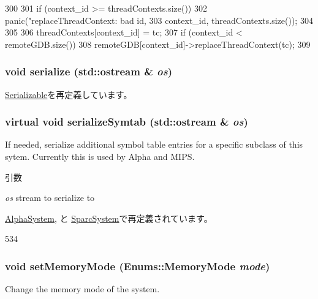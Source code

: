 \begin{DoxyCode}
300 {
301     if (context_id >= threadContexts.size()) {
302         panic("replaceThreadContext: bad id, %
303               context_id, threadContexts.size());
304     }
305 
306     threadContexts[context_id] = tc;
307     if (context_id < remoteGDB.size())
308         remoteGDB[context_id]->replaceThreadContext(tc);
309 }
\end{DoxyCode}
\hypertarget{classSystem_a53e036786d17361be4c7320d39c99b84}{
\subsubsection[{serialize}]{\setlength{\rightskip}{0pt plus 5cm}void serialize (std::ostream \& {\em os})}}
\label{classSystem_a53e036786d17361be4c7320d39c99b84}


\hyperlink{classSerializable_ad6272f80ae37e8331e3969b3f072a801}{Serializable}を再定義しています。\hypertarget{classSystem_a4a6e514fbf1ef35f9a914680884cedef}{
\subsubsection[{serializeSymtab}]{\setlength{\rightskip}{0pt plus 5cm}virtual void serializeSymtab (std::ostream \& {\em os})}}
\label{classSystem_a4a6e514fbf1ef35f9a914680884cedef}
If needed, serialize additional symbol table entries for a specific subclass of this sytem. Currently this is used by Alpha and MIPS.


\begin{DoxyParams}{引数}
\item[{\em os}]stream to serialize to \end{DoxyParams}


\hyperlink{classAlphaSystem_a4a3f2000b7188750d8fc90aa204fbfd9}{AlphaSystem}, と \hyperlink{classSparcSystem_a4a3f2000b7188750d8fc90aa204fbfd9}{SparcSystem}で再定義されています。


\begin{DoxyCode}
534 {}
\end{DoxyCode}
\hypertarget{classSystem_ae0c4408279fbea962460bccd251cffe5}{
\subsubsection[{setMemoryMode}]{\setlength{\rightskip}{0pt plus 5cm}void setMemoryMode (Enums::MemoryMode {\em mode})}}
\label{classSystem_ae0c4408279fbea962460bccd251cffe5}
Change the memory mode of the system.

